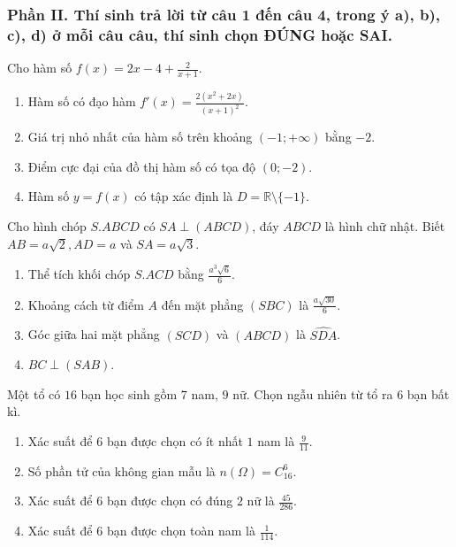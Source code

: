 \subsubsection*{Phần II. Thí sinh trả lời từ câu 1 đến câu 4, trong ý a), b), c), d) ở mỗi câu câu, thí sinh chọn ĐÚNG hoặc SAI.}
\setcounter{bt}{0}
\begin{baitap}
	Cho hàm số $f(x)=2x-4+\frac{2}{x+1}$.
	\begin{enumerate}[\quad \bf a)]
		\item Hàm số có đạo hàm $f'(x)=\frac{2(x^2+2x)}{(x+1)^2}$.
		\item Giá trị nhỏ nhất của hàm số trên khoảng $(-1;+\infty)$ bằng $-2$.
		\item Điểm cực đại của đồ thị hàm số có tọa độ $(0;-2)$.
		\item Hàm số $y=f(x)$ có tập xác định là $D=\mathbb{R}\setminus \{-1\}$.
	\end{enumerate}
\end{baitap}

\begin{baitap}
	Cho hình chóp $S.ABCD$ có $SA\perp (ABCD)$, đáy $ABCD$ là hình chữ nhật. Biết $AB=a\sqrt{2}, AD=a$ và $SA=a\sqrt{3}$.
	\begin{enumerate}[\quad \bf a)]
		\item Thể tích khối chóp $S.ACD$ bằng $\frac{a^3\sqrt{6}}{6}$.
		\item Khoảng cách từ điểm $A$ đến mặt phẳng $(SBC)$ là $\frac{a\sqrt{30}}{6}$.
		\item Góc giữa hai mặt phẳng $(SCD)$ và $(ABCD)$ là $\widehat{SDA}$.
		\item $BC\perp (SAB)$.
	\end{enumerate}
\end{baitap}

\begin{baitap}
	Một tổ có $16$ bạn học sinh gồm $7$ nam, $9$ nữ. Chọn ngẫu nhiên từ tổ ra $6$ bạn bất kì.
	\begin{enumerate}[\quad \bf a)]
		\item Xác suất để $6$ bạn được chọn có ít nhất $1$ nam là $\frac{9}{11}$.
		\item Số phần tử của không gian mẫu là $n(\Omega)=C_{16}^6$.
		\item Xác suất để $6$ bạn được chọn có đúng $2$ nữ là $\frac{45}{286}$.
		\item Xác suất để 6 bạn được chọn toàn nam là $\frac{1}{114}$.
	\end{enumerate}
\end{baitap}

